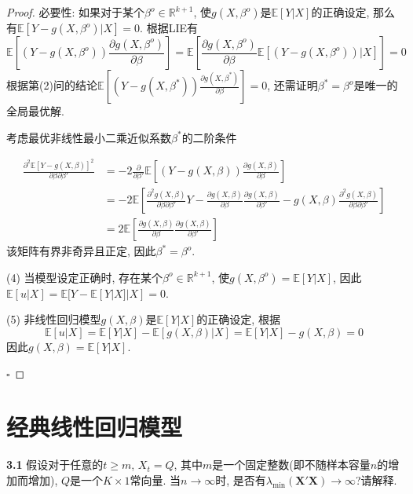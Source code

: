 \documentclass[cn,12pt,math=mtpro2,citestyle=gb7714-2015,bibstyle=gb7714-2015,twocol,mode=simple]{elegantbook}
\newcommand{\E}{\mathbb{E}}
\begin{document}
\begin{proof}
  必要性: 如果对于某个$\beta^o\in\mathbb{R}^{k+1}$, 使$g(X,\beta^o)$是$\E[Y|X]$的正确设定, 那么有$\E[Y-g(X,\beta^o)|X]=0$. 根据LIE有
  $$\E\left[(Y-g(X,\beta^{o}))\frac{\partial g(X,\beta^o)}{\partial \beta}\right]=\E\left[\frac{\partial g(X,\beta^o)}{\partial \beta}\E\left[(Y-g(X,\beta^o))|X\right]\right]=0$$
  根据第(2)问的结论$\displaystyle\E\left[(Y-g(X,\beta^{\ast}))\frac{\partial g(X,\beta^\ast)}{\partial \beta}\right]=0$, 还需证明$\beta^\ast=\beta^o$是唯一的全局最优解.

  考虑最优非线性最小二乘近似系数$\beta^{\ast}$的二阶条件

  \begin{align}
  \frac{\partial^2\E[Y-g(X,\beta)]^2 }{\partial\beta\partial\beta' }&=-2\frac{\partial}{\partial\beta'}\E\left[(Y-g(X,\beta))\frac{\partial g(X,\beta)}{\partial \beta}\right] \nonumber \\
  &=-2\E\left[\frac{\partial^2g(X,\beta)}{\partial\beta\partial\beta' }Y-\frac{\partial g(X,\beta)}{\partial\beta}\frac{\partial g(X,\beta)}{\partial\beta'}-g(X,\beta)\frac{\partial^2g(X,\beta)}{\partial\beta\partial\beta' }\right] \nonumber \\
  &=2\E\left[\frac{\partial g(X,\beta)}{\partial\beta}\frac{\partial g(X,\beta)}{\partial\beta'}\right]\nonumber
  \end{align}
  该矩阵有界非奇异且正定, 因此$\beta^{\ast}=\beta^o$.

  (4) 当模型设定正确时, 存在某个$\beta^o\in\mathbb{R}^{k+1}$, 使$g(X,\beta^o)=\E[Y|X]$, 因此$\E[u|X]=\E[Y-\E[Y|X]|X]=0$.

  (5) 非线性回归模型$g(X,\beta)$是$\E[Y|X]$的正确设定, 根据
  $$\E[u|X]=\E[Y|X]-\E[g(X,\beta)|X]=\E[Y|X]-g(X,\beta)=0$$
  因此$g(X,\beta)=\E[Y|X]$.

  $\square$
\end{proof}
\newpage
\chapter*{经典线性回归模型}
\textbf{3.1} 假设对于任意的$t\geq m$, $X_t=Q$, 其中$m$是一个固定整数(即不随样本容量$n$的增加而增加), $Q$是一个$K\times 1$常向量. 当$n\rightarrow\infty$时, 是否有$\lambda_{\min}(\mathbf{X}'\mathbf{X})\rightarrow\infty$?请解释.
\end{document}
